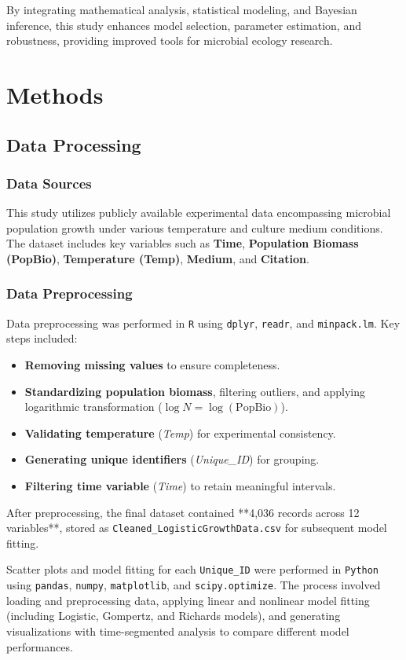 \documentclass{article}
\begin{document}
By integrating mathematical analysis, statistical modeling, and Bayesian inference, this study enhances model selection, parameter estimation, and robustness, providing improved tools for microbial ecology research.
\section{Methods}

\subsection{Data Processing}
\subsubsection{Data Sources}
This study utilizes publicly available experimental data encompassing microbial population growth under various temperature and culture medium conditions. The dataset includes key variables such as \textbf{Time}, \textbf{Population Biomass (PopBio)}, \textbf{Temperature (Temp)}, \textbf{Medium}, and \textbf{Citation}.  

\subsubsection{Data Preprocessing}  
Data preprocessing was performed in \texttt{R} using \texttt{dplyr}, \texttt{readr}, and \texttt{minpack.lm}. Key steps included:  
\begin{itemize}  
    \item \textbf{Removing missing values} to ensure completeness.  
    \item \textbf{Standardizing population biomass}, filtering outliers, and applying logarithmic transformation (\(\log N = \log(\text{PopBio})\)).  
    \item \textbf{Validating temperature} (\textit{Temp}) for experimental consistency.  
    \item \textbf{Generating unique identifiers} (\textit{Unique\_ID}) for grouping.  
    \item \textbf{Filtering time variable} (\textit{Time}) to retain meaningful intervals.  
\end{itemize}  


After preprocessing, the final dataset contained **4,036 records across 12 variables**, stored as \texttt{Cleaned\_LogisticGrowthData.csv} for subsequent model fitting. 

Scatter plots and model fitting for each \texttt{Unique\_ID} were performed in \texttt{Python} using \texttt{pandas}, \texttt{numpy}, \texttt{matplotlib}, and \texttt{scipy.optimize}. The process involved loading and preprocessing data, applying linear and nonlinear model fitting (including Logistic, Gompertz, and Richards models), and generating visualizations with time-segmented analysis to compare different model performances.
\end{document}
